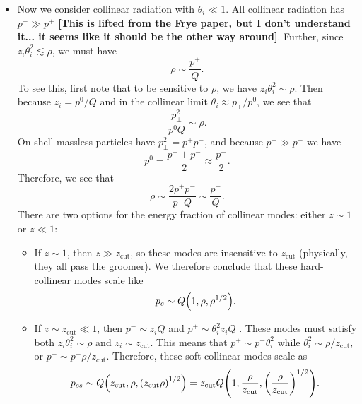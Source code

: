\documentclass[11pt,twoside,reqno]{amsart}
\theoremstyle{plain}
\theoremstyle{remark}
\theoremstyle{definition}
\theoremstyle{remark}
\theoremstyle{definition}
\theoremstyle{definition}
\newcommand{\zcut}{z_\mathrm{cut}}
\begin{document}
\begin{itemize}
		\item Now we consider collinear radiation with $\theta_i \ll 1$. All collinear radiation has $p^- \gg p^+$ {\color{red}\textbf{[This is lifted from the Frye paper, but I don't understand it... it seems like it should be the other way around]}}. Further, since $z_i \theta_i^2 \lesssim \rho$, we must have \cite{frye_factorization_2016}
		\begin{equation}
			\rho \sim \frac{p^+}{Q}.
		\end{equation}
		To see this, first note that to be sensitive to $\rho$, we have $z_i \theta_i^2 \sim \rho$. Then because $z_i = p^0/Q$ and in the collinear limit $\theta_i \approx p_\perp / p^0$, we see that
		\begin{equation}
			\frac{p_\perp^2}{p^0 Q} \sim \rho.
		\end{equation}
		On-shell massless particles have $p_\perp^2 = p^+ p^-$, and because $p^- \gg p^+$ we have
		\begin{equation}
			p^0 = \frac{p^+ + p^-}{2} \approx \frac{p^-}{2}.
		\end{equation}
		Therefore, we see that
		\begin{equation}
			\rho \sim \frac{2 p^+ p^-}{p^- Q} \sim \frac{p^+}{Q}.
		\end{equation}
		There are two options for the energy fraction of collinear modes: either $z \sim 1$ or $z \ll 1$:
		\begin{itemize}
			\item If $z \sim 1$, then $z \gg \zcut$, so these modes are insensitive to $\zcut$ (physically, they all pass the groomer). We therefore conclude that these hard-collinear modes scale like
			\begin{equation}
				p_c \sim Q \qty(1, \rho, \rho^{1/2}).
			\end{equation}

			\item If $z \sim \zcut \ll 1$, then $p^- \sim z_i Q$ and $p^+ \sim \theta_i^2 z_i Q$ \cite{frye_factorization_2016}. These modes must satisfy both $z_i \theta_i^2 \sim \rho$ and $z_i \sim \zcut$. This means that $p^+ \sim p^- \theta_i^2$ while $\theta_i^2 \sim \rho/\zcut$, or $p^+ \sim p^- \rho / \zcut$. Therefore, these soft-collinear modes scale as
			\begin{equation}
				p_{cs} \sim Q\qty(\zcut, \rho, \qty(\zcut \rho)^{1/2}) = \zcut Q \qty(1, \frac{\rho}{\zcut}, \qty(\frac{\rho}{\zcut})^{1/2}).
			\end{equation}
		\end{itemize}
	\end{itemize}
\end{document}
